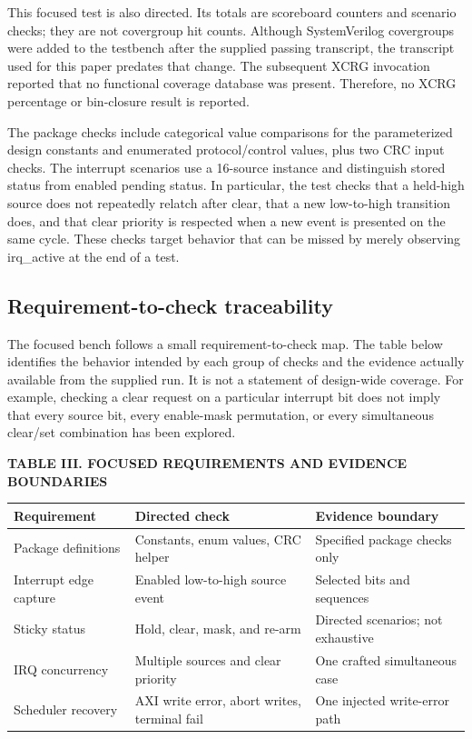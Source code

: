 \documentclass[conference]{IEEEtran}
\begin{document}
This focused test is also directed. Its totals are scoreboard counters and scenario checks; they are not covergroup hit counts. Although SystemVerilog covergroups were added to the testbench after the supplied passing transcript, the transcript used for this paper predates that change. The subsequent XCRG invocation reported that no functional coverage database was present. Therefore, no XCRG percentage or bin-closure result is reported.

The package checks include categorical value comparisons for the parameterized design constants and enumerated protocol/control values, plus two CRC input checks. The interrupt scenarios use a 16-source instance and distinguish stored status from enabled pending status. In particular, the test checks that a held-high source does not repeatedly relatch after clear, that a new low-to-high transition does, and that clear priority is respected when a new event is presented on the same cycle. These checks target behavior that can be missed by merely observing irq\_active at the end of a test.

\subsection{Requirement-to-check traceability}

The focused bench follows a small requirement-to-check map. The table below identifies the behavior intended by each group of checks and the evidence actually available from the supplied run. It is not a statement of design-wide coverage. For example, checking a clear request on a particular interrupt bit does not imply that every source bit, every enable-mask permutation, or every simultaneous clear/set combination has been explored.

\noindent\textbf{\footnotesize TABLE III. FOCUSED REQUIREMENTS AND EVIDENCE BOUNDARIES}\par\vspace{1pt}

\begin{center}
\scriptsize
\setlength{\tabcolsep}{2.5pt}
\renewcommand{\arraystretch}{1.08}
\begin{tabularx}{\columnwidth}{@{}>{\raggedright\arraybackslash}p{}>{\raggedright\arraybackslash}p{}>{\raggedright\arraybackslash}X@{}}
\toprule
\textbf{Requirement} & \textbf{Directed check} & \textbf{Evidence boundary} \\
\midrule
Package definitions & Constants, enum values, CRC helper & Specified package checks only \\
Interrupt edge capture & Enabled low-to-high source event & Selected bits and sequences \\
Sticky status & Hold, clear, mask, and re-arm & Directed scenarios; not exhaustive \\
IRQ concurrency & Multiple sources and clear priority & One crafted simultaneous case \\
Scheduler recovery & AXI write error, abort writes, terminal fail & One injected write-error path \\
\bottomrule
\end{tabularx}
\end{center}
\end{document}
